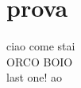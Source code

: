 \documentclass{article}
\begin{document}
    \section{prova}
        ciao come stai\\
        ORCO BOIO\\
        last one! ao
\end{document}
